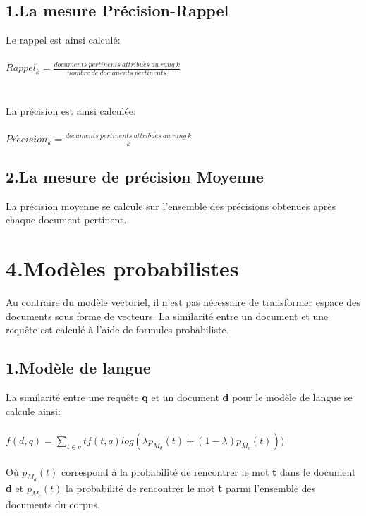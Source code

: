 \documentclass[a4paper,11pt]{report}
\begin{document}
\subsection*{1.La mesure Précision-Rappel}
Le rappel est ainsi calculé:\\\\
$Rappel_k = \frac{documents~pertinents~attribu\acute{e}s~au~rang~k}{nombre~de~documents~pertinents}$\\\\\\

La précision est ainsi calculée:\\\\
$Pr\acute{e}cision_k = \frac{documents~pertinents~attribu\acute{e}s~au~rang~k}{k}$ 

\subsection*{2.La mesure de précision Moyenne}

La précision moyenne se calcule sur l'ensemble des précisions obtenues après chaque document pertinent. 






\section*{4.Modèles probabilistes}

Au contraire du modèle vectoriel, il n'est pas nécessaire de transformer espace des documents sous forme de vecteurs. La similarité entre un document et une requête est calculé à l'aide de formules probabiliste.

\subsection*{1.Modèle de langue}
La similarité entre une requête \textbf{q} et un document \textbf{d} pour le modèle de langue se calcule ainsi:\\\\
 $f(d,q)=\sum_{t \in q } tf(t,q) log( \lambda p_{M_d} (t)+(1- \lambda )p_{M_c} (t)))$\\\\ Où  $p_{M_d}(t)$ correspond à la probabilité de rencontrer le mot \textbf{t}  dans le document \textbf{d} et  $p_{M_c}(t)$ la probabilité de rencontrer le mot \textbf{t} parmi l'ensemble des documents du corpus.
 
\end{document}
